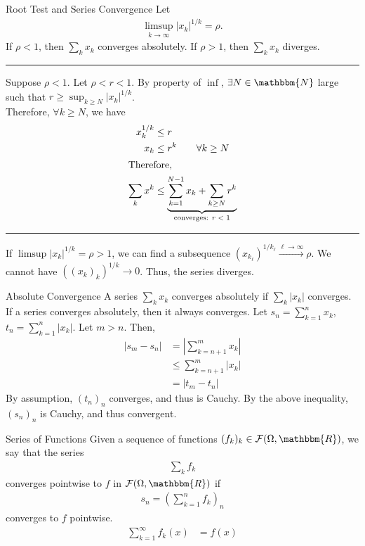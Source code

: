 \documentclass[10pt]{extarticle}
\newcommand{\N}{\mathbbm{N}}
\newcommand{\R}{\mathbbm{R}}
\begin{document}
  \begin{problem}{Root Test and Series Convergence}
    Let
    \begin{align*}
      \limsup_{k\rightarrow\infty}|x_k|^{1/k} = \rho.
    \end{align*}
    If $\rho < 1$, then $\sum_k x_k$ converges absolutely. If $\rho > 1$, then $\sum_k x_k$ diverges.\\
    \vspace{4pt}
    \rule{\textwidth}{0.4pt}
    \vspace{4pt}
    Suppose $\rho < 1$. Let $\rho < r < 1$. By property of $\inf$, $\exists N\in \N$ large such that $r \geq \sup_{k\geq N}|x_k|^{1/k}$.\\

    Therefore, $\forall k\geq N$, we have
    \begin{align*}
      x_k^{1/k} &\leq r\\
      x_k &\leq r^k \tag*{$\forall k \geq N$}\\
      \shortintertext{Therefore,}
      \sum_k x^k &\leq \underbrace{\sum_{k=1}^{N-1} x_k + \sum_{k\geq N}r^k}_{\text{converges: $r < 1$}}
    \end{align*}
    \vspace{4pt}
    \rule{\textwidth}{0.4pt}
    \vspace{4pt}
    If $\limsup |x_k|^{1/k} = \rho > 1$, we can find a subsequence $\left(x_{k_\ell}\right)^{1/{k_\ell}} \xrightarrow{\ell\rightarrow\infty} \rho$. We cannot have $\left((x_k)_k\right)^{1/k} \rightarrow 0$. Thus, the series diverges.
  \end{problem}
  \begin{problem}{Absolute Convergence}
    A series $\sum_k x_k$ converges absolutely if $\sum_k |x_k|$ converges. If a series converges absolutely, then it always converges.
    \tcblower
    Let $s_n = \sum_{k=1}^{n}x_k$, $t_n = \sum_{k=1}^{n}|x_k|$. Let $m > n$. Then,
    \begin{align*}
      \left|s_m - s_n\right| &= \left|\sum_{k=n+1}^{m}x_k\right|\\
                             &\leq \sum_{k=n+1}^{m}|x_k|\tag*{Triangle Inequality}\\
                             &= |t_m - t_n|
    \end{align*}
    By assumption, $(t_n)_n$ converges, and thus is Cauchy. By the above inequality, $(s_n)_n$ is Cauchy, and thus convergent.
  \end{problem}
  \begin{problem}{Series of Functions}
    Given a sequence of functions $(f_k)_k \in \mathcal{F}(\Omega,\R)$, we say that the series
    \begin{align*}
      \sum_{k}f_k
    \end{align*}
    converges pointwise to $f$ in $\mathcal{F}(\Omega,\R)$ if
    \begin{align*}
      s_n = \left(\sum_{k=1}^{n}f_k\right)_n
    \end{align*}
    converges to $f$ pointwise.
    \begin{align*}
      \sum_{k=1}^{\infty}f_k(x) &= f(x) \tag*{$\forall x\in\Omega$}
    \end{align*}
  \end{problem}
\end{document}
